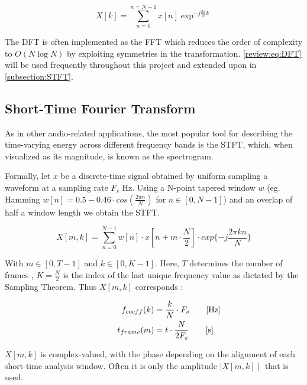 \begin{equation}
  X[k] =\sum_{n=0}^{n=N-1} x[n] \exp^{-j \frac{2 \pi}{N} k }
  \label{review:eq:DFT}
\end{equation}

The \ac{DFT} is often implemented as the \ac{FFT} which reduces the
order of complexity to $O(N\log{N})$ by exploiting symmetries in the
transformation. \cite{OppenheimDSP} \autoref{review:eq:DFT} will be used
frequently throughout this project and extended upon in
\autoref{subsection:STFT}.

\subsection{Short-Time Fourier Transform}
\label{subsection:STFT}

As in other audio-related applications, the most popular tool for describing the
time-varying energy across different frequency bands is the \ac{STFT}, which,
when visualized as its magnitude, is known as the spectrogram.

Formally, let $x$ be a discrete-time signal obtained by uniform sampling a
waveform at a sampling rate $F_{s}$ Hz. Using a N-point tapered window $w$ (eg.
Hamming $w[n] = 0.5-0.46\cdot cos(\frac{2\pi n}{N})$ for
$n\in\left[0,N-1\right]$) and an overlap of half a window length we obtain the
STFT.

\begin{equation}
  X [m,k] = \sum_{n=0}^{N-1}w[n]\cdot x[n + m\cdot\frac{N}{2}]\cdot exp\{-j\frac{2\pi k n }{N}\}
\end{equation}

With $m\in\left[0,T-1\right]$ and $k\in\left[0,K-1\right]$. Here, $T$ determines
the number of frames , $K = \frac{N}{2}$ is the index of the last unique
frequency value as dictated by the Sampling Theorem. Thus $X[m,k]$ corresponds :

\begin{equation}
  \begin{aligned}
    f_{coeff}(k) & = \frac{k}{N} \cdot F_{s} \mathrlap{\qquad [\si{\hertz}]}   \\
    t_{frame}(m) & = t \cdot \frac{N}{2F_{s}} \mathrlap{\qquad [\si{\second}]}
  \end{aligned}
  \label{review:eq:tradeoff}
\end{equation}

$X[m,k]$ is complex-valued, with the phase depending on the alignment of each
short-time analysis window. Often it is only the amplitude $\mid X[m,k] \mid$
that is used.
\cite{OppenheimDSP}

